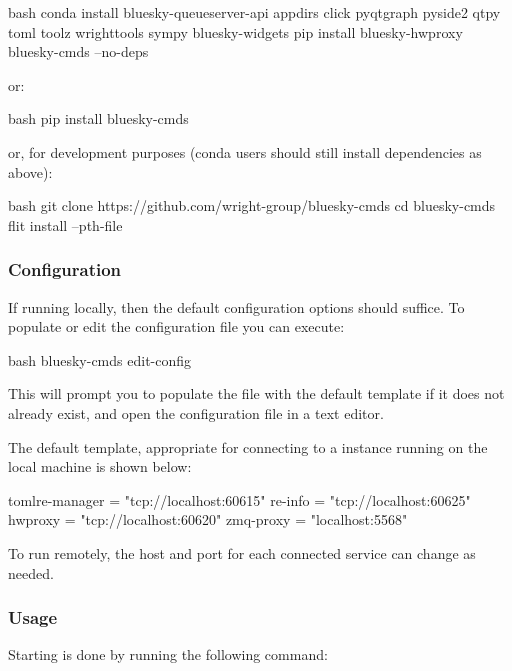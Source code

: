 \begin{codefragment}{bash}
conda install bluesky-queueserver-api appdirs click pyqtgraph pyside2 qtpy toml toolz wrighttools sympy bluesky-widgets
pip install bluesky-hwproxy bluesky-cmds --no-deps
\end{codefragment}

or:

\begin{codefragment}{bash}
pip install bluesky-cmds
\end{codefragment}

or, for development purposes (conda users should still install dependencies as above):

\begin{codefragment}{bash}
git clone https://github.com/wright-group/bluesky-cmds
cd bluesky-cmds
flit install --pth-file
\end{codefragment}

\subsubsection{Configuration}

If running locally, then the default configuration options should suffice.
To populate or edit the configuration file you can execute:

\begin{codefragment}{bash}
bluesky-cmds edit-config
\end{codefragment}

This will prompt you to populate the file with the default template if it does not already exist, and open the configuration file in a text editor.

The default template, appropriate for connecting to a \biab instance running on the local machine is shown below:

\begin{codefragment}{toml}\noop[bluesky]
re-manager = "tcp://localhost:60615"
re-info = "tcp://localhost:60625"
hwproxy = "tcp://localhost:60620"
zmq-proxy = "localhost:5568"
\end{codefragment}

To run remotely, the host and port for each connected service can change as needed.

\subsubsection{Usage}


Starting \blueskycmds is done by running the following command:

